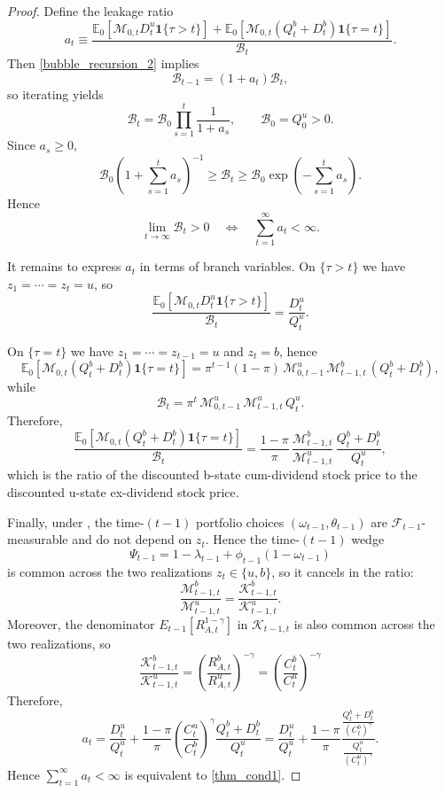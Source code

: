 \documentclass[12pt]{article}
\theoremstyle{plain}
\begin{document}
\begin{proof}
Define the leakage ratio
\[
a_t\equiv
\frac{
\mathbb E_0\!\left[\mathcal M_{0,t}D_t^u\mathbf 1\{\tau>t\}\right]
+
\mathbb E_0\!\left[\mathcal M_{0,t}(Q_t^b+D_t^b)\mathbf 1\{\tau=t\}\right]
}{
\mathcal B_t
}.
\]
Then \eqref{bubble_recursion_2} implies
\[
\mathcal B_{t-1}=(1+a_t)\mathcal B_t,
\]
so iterating yields
\[
\mathcal B_t=\mathcal B_0\prod_{s=1}^t\frac{1}{1+a_s},
\qquad
\mathcal B_0=Q_0^u>0.
\]
Since $a_s\ge 0$,
\[
\mathcal B_0\left(1+\sum_{s=1}^t a_s\right)^{-1}
\ge
\mathcal B_t
\ge
\mathcal B_0\exp\!\left(-\sum_{s=1}^t a_s\right).
\]
Hence
\[
\lim_{t\to\infty}\mathcal B_t>0
\quad\Longleftrightarrow\quad
\sum_{t=1}^\infty a_t<\infty.
\]

It remains to express $a_t$ in terms of branch variables. On $\{\tau>t\}$ we have
$z_1=\cdots=z_t=u$, so
\[
\frac{
\mathbb E_0\!\left[\mathcal M_{0,t}D_t^u\mathbf 1\{\tau>t\}\right]
}{
\mathcal B_t
}
=
\frac{D_t^u}{Q_t^u}.
\]

On $\{\tau=t\}$ we have $z_1=\cdots=z_{t-1}=u$ and $z_t=b$, hence
\[
\mathbb E_0\!\left[\mathcal M_{0,t}(Q_t^b+D_t^b)\mathbf 1\{\tau=t\}\right]
=
\pi^{t-1}(1-\pi)\,
\mathcal M_{0,t-1}^u\,
\mathcal M_{t-1,t}^b\,
(Q_t^b+D_t^b),
\]
while
\[
\mathcal B_t
=
\pi^t\,
\mathcal M_{0,t-1}^u\,
\mathcal M_{t-1,t}^u\,
Q_t^u.
\]
Therefore,
\[
\frac{
\mathbb E_0\!\left[\mathcal M_{0,t}(Q_t^b+D_t^b)\mathbf 1\{\tau=t\}\right]
}{
\mathcal B_t
}
=
\frac{1-\pi}{\pi}\,
\frac{\mathcal M_{t-1,t}^b}{\mathcal M_{t-1,t}^u}\,
\frac{Q_t^b+D_t^b}{Q_t^u},
\]
which is the ratio of the discounted b-state cum-dividend stock price to the discounted u-state ex-dividend stock price.

Finally, under , the time-$(t-1)$ portfolio choices
$(\omega_{t-1},\theta_{t-1})$ are $\mathcal F_{t-1}$-measurable and do not depend on $z_t$.
Hence the time-$(t-1)$ wedge
\[
\Psi_{t-1}=1-\lambda_{t-1}+\phi_{t-1}(1-\omega_{t-1})
\]
is common across the two realizations $z_t\in\{u,b\}$, so it cancels in the ratio:
\[
\frac{\mathcal M_{t-1,t}^b}{\mathcal M_{t-1,t}^u}
=
\frac{\mathcal K_{t-1,t}^b}{\mathcal K_{t-1,t}^u}.
\]
Moreover, the denominator
$E_{t-1}[R_{A,t}^{1-\gamma}]$ in $\mathcal K_{t-1,t}$ is also common across the two realizations,
so
\[
\frac{\mathcal K_{t-1,t}^b}{\mathcal K_{t-1,t}^u}
=
\left(\frac{R_{A,t}^b}{R_{A,t}^u}\right)^{-\gamma}
=
\left(\frac{C_t^b}{C_t^u}\right)^{-\gamma}
\]
Therefore,
\[
a_t
=
\frac{D_t^u}{Q_t^u}
+\frac{1-\pi}{\pi}
\left(\frac{C_t^u}{C_t^b}\right)^\gamma
\frac{Q_t^b+D_t^b}{Q_t^u}
=
\frac{D_t^u}{Q_t^u}
+\frac{1-\pi}{\pi}
\frac{\frac{Q_t^b+D_t^b}{(C_t^b)^\gamma}}{\frac{Q_t^u}{(C_t^u)^\gamma}}.
\]
Hence $\sum_{t=1}^\infty a_t<\infty$ is equivalent to \eqref{thm_cond1}.
\end{proof}
\end{document}
